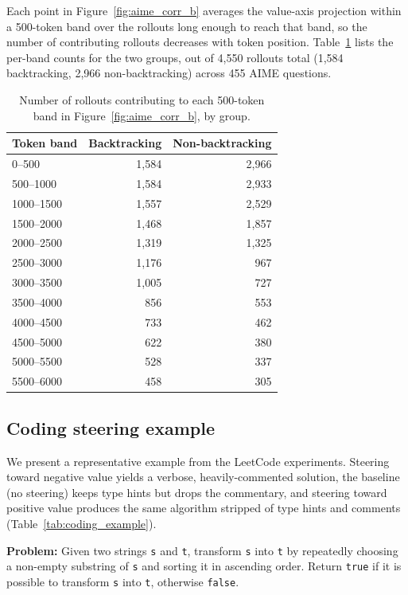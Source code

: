 \documentclass{article}
\begin{document}
Each point in Figure~\ref{fig:aime_corr_b} averages the value-axis projection within a 500-token band over the rollouts long enough to reach that band, so the number of contributing rollouts decreases with token position. Table~\ref{tab:bt_window_n} lists the per-band counts for the two groups, out of 4{,}550 rollouts total (1{,}584 backtracking, 2{,}966 non-backtracking) across 455 AIME questions.

\begin{table}[h]
\centering
\small
\begin{tabular}{lrr}
\toprule
Token band & Backtracking & Non-backtracking \\
\midrule
0--500     & 1{,}584 & 2{,}966 \\
500--1000  & 1{,}584 & 2{,}933 \\
1000--1500 & 1{,}557 & 2{,}529 \\
1500--2000 & 1{,}468 & 1{,}857 \\
2000--2500 & 1{,}319 & 1{,}325 \\
2500--3000 & 1{,}176 & 967 \\
3000--3500 & 1{,}005 & 727 \\
3500--4000 & 856 & 553 \\
4000--4500 & 733 & 462 \\
4500--5000 & 622 & 380 \\
5000--5500 & 528 & 337 \\
5500--6000 & 458 & 305 \\
\bottomrule
\end{tabular}
\caption{Number of rollouts contributing to each 500-token band in Figure~\ref{fig:aime_corr_b}, by group.}
\label{tab:bt_window_n}
\end{table}

\subsection{Coding steering example}
\label{app:coding_example}

We present a representative example from the LeetCode experiments. Steering toward negative value yields a verbose, heavily-commented solution, the baseline (no steering) keeps type hints but drops the commentary, and steering toward positive value produces the same algorithm stripped of type hints and comments (Table~\ref{tab:coding_example}).

\begin{mdframed}[backgroundcolor=gray!10, linecolor=gray!40, innertopmargin=4pt, innerbottommargin=4pt, innerleftmargin=6pt, innerrightmargin=6pt, skipabove=6pt, skipbelow=4pt]
\small\textbf{Problem:} Given two strings \texttt{s} and \texttt{t}, transform \texttt{s} into \texttt{t} by repeatedly choosing a non-empty substring of \texttt{s} and sorting it in ascending order. Return \texttt{true} if it is possible to transform \texttt{s} into \texttt{t}, otherwise \texttt{false}.
\end{mdframed}
\end{document}
